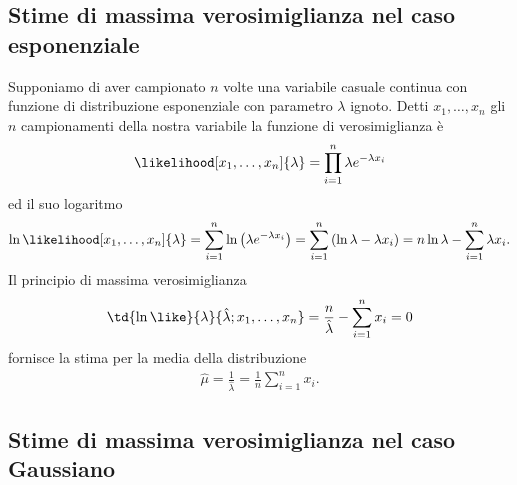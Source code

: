 \subsection{Stime di massima verosimiglianza nel caso esponenziale}

Supponiamo di aver campionato $n$ volte una variabile casuale continua
con funzione di distribuzione esponenziale con parametro $\lambda$ ignoto.
Detti $x_1,\ldots,x_n$ gli $n$ campionamenti della nostra variabile la funzione
di verosimiglianza è
\begin{align*}
  \likelihood[x_1,\ldots,x_n]{\lambda} =
  \prod_{i = 1}^n \lambda e^{-\lambda x_i}
\end{align*}
ed il suo logaritmo
\begin{align*}
  \ln\likelihood[x_1,\ldots,x_n]{\lambda} =
  \sum_{i = 1}^n \ln \left( \lambda e^{-\lambda x_i} \right) =
  \sum_{i = 1}^n \left( \ln\lambda - \lambda x_i \right) =
  n\ln\lambda - \sum_{i = 1}^n \lambda x_i.
\end{align*}
Il principio di massima verosimiglianza
\begin{align*}
  \td{\ln\like}{\lambda}{\hat\lambda;x_1,\ldots,x_n} =
  \frac{n}{\hat\lambda} - \sum_{i = 1}^n x_i = 0
\end{align*}
fornisce la stima per la media della distribuzione
\begin{align}
  \hat\mu = \frac{1}{\hat\lambda} = \frac{1}{n} \sum_{i = 1}^n x_i.
\end{align}



\subsection{Stime di massima verosimiglianza nel caso Gaussiano}

